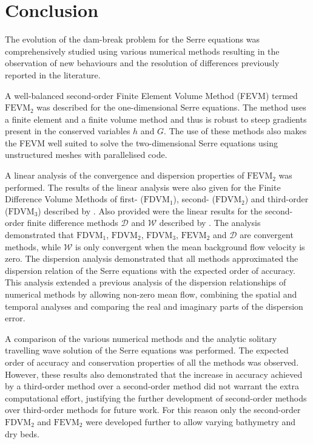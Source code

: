 
\chapter{Conclusion}
\label{chp:Conclusion}



The evolution of the dam-break problem for the Serre equations was comprehensively studied using various numerical methods resulting in the observation of new behaviours and the resolution of differences previously reported in the literature. 

A well-balanced second-order Finite Element Volume Method (FEVM) termed $\text{FEVM}_2$ was described for the one-dimensional Serre equations. The method uses a finite element and a finite volume method and thus is robust to steep gradients present in the conserved variables $h$ and $G$. The use of these methods also makes the FEVM well suited to solve the two-dimensional Serre equations using unstructured meshes with parallelised code. 

A linear analysis of the convergence and dispersion properties of $\text{FEVM}_2$ was performed. The results of the linear analysis were also given for the Finite Difference Volume Methods of first- ($\text{FDVM}_1$), second- ($\text{FDVM}_2$) and third-order ($\text{FDVM}_3$) described by \citet{Zoppou-etal-2017}. Also provided were the linear results for the second-order finite difference methods $\mathcal{D}$ and $\mathcal{W}$ described by \citet{Pitt-2018-61}. The analysis demonstrated that $\text{FDVM}_1$, $\text{FDVM}_2$, $\text{FDVM}_3$, $\text{FEVM}_2$ and $\mathcal{D}$ are convergent methods, while $\mathcal{W}$ is only convergent when the mean background flow velocity is zero. The dispersion analysis demonstrated that all methods approximated the dispersion relation of the Serre equations with the expected order of accuracy. This analysis extended a previous analysis of the dispersion relationships of numerical methods \cite{Filippini-etal-2016-381} by allowing non-zero mean flow, combining the spatial and temporal analyses and comparing the real and imaginary parts of the dispersion error. 

A comparison of the various numerical methods and the analytic solitary travelling wave solution of the Serre equations was performed. The expected order of accuracy and conservation properties of all the methods was observed. However, these results also demonstrated that the increase in accuracy achieved by a third-order method over a second-order method did not warrant the extra computational effort, justifying the further development of second-order methods over third-order methods for future work. For this reason only the second-order $\text{FDVM}_2$ and $\text{FEVM}_2$ were developed further to allow varying bathymetry and dry beds.

